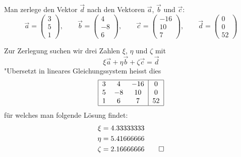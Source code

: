 Man zerlege den Vektor $\vec d$ nach den Vektoren $\vec a$, $\vec b$ und
$\vec c$:
\[
\vec a=\begin{pmatrix}3\\5\\1\end{pmatrix},\qquad
\vec b=\begin{pmatrix}4\\-8\\6\end{pmatrix},\qquad
\vec c=\begin{pmatrix}-16\\10\\7\end{pmatrix},\qquad
\vec d=\begin{pmatrix}0\\0\\52\end{pmatrix}
\]


\begin{loesung}
Zur Zerlegung suchen wir drei Zahlen $\xi$, $\eta$ und $\zeta$ mit
\[
\xi \vec a
+
\eta \vec b
+
\zeta \vec c
=
\vec d
\]
"Ubersetzt in lineares Gleichungssystem heisst dies
\[
\begin{tabular}{|ccc|c|}
\hline
3&4&$-16$&0\\
5&$-8$&10&0\\
1&6&7&52\\
\hline
\end{tabular}
\]
für welches man folgende Lösung findet:
\begin{align*}
\xi&=4.33333333\\
\eta&=5.41666666\\
\zeta&=2.16666666
\qedhere
\end{align*}
\end{loesung}

